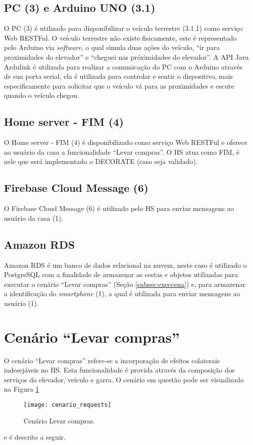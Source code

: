 \subsection{PC (3) e Arduino UNO (3.1)}
\label{subsec:pcarduino}
O PC (3) é utilizado para disponibilizar o veículo terrestre (3.1.1) como serviço Web RESTFul. O veículo terrestre não existe fisicamente, este é representado pelo Arduino via \textit{software}, o qual simula duas ações do veículo, ``ir para proximidades do elevador'' e ``cheguei nas próximidades do elevador''. A API Java Ardulink\footnotemark {} é utilizada para realizar a comunicação do PC com o Arduino através de sua porta serial, ela é utilizada para controlar e sentir o dispositivo, mais especificamente para solicitar que o veículo vá para as proximidades e escute quando o veículo chegou.

\subsection{Home server - FIM (4)}
\label{subsec:hsfim}
O Home server - FIM (4) é disponibilizado como serviço Web RESTFul e oferece ao usuário da casa a funcionalidade ``Levar compras''. O HS atua como FIM, é nele que será implementado o DECORATE (caso seja validado).

\subsection{Firebase Cloud Message (6)}
\label{subsec:fireb}
O Firebase Cloud Message\footnotemark {} (6) é utilizado pelo HS para enviar mensagens ao usuário da casa (1).

\subsection{Amazon RDS}
\label{subsec:rds}
Amazon RDS\footnotemark {} é um banco de dados relacional na nuvem, neste caso é utilizado o PostgreSQL\footnotemark {} com a finalidade de armazenar as cestas e objetos utilizadas para executar o cenário ``Levar compras'' (Seção \ref{subsec:execcena}) e, para armazenar a identificação do \textit{smartphone} (1), a qual é utilizada para enviar mensagens ao usuário (1).
 
\section{Cenário ``Levar compras''}
\label{sec:cenario}
O cenário ``Levar compras'' refere-se a incorporação de efeitos colaterais indesejáveis no HS. Esta funcionalidade é provida através da composição dos serviços do elevador, veículo e garra. O cenário em questão pode ser visualizado na Figura \ref{fig:cenario} 
\begin{figure}[!htb] \centering 
  \centering
  \texttt{[image: cenario\_requests]} 
  \caption{Cenário Levar compras.} 
  \label{fig:cenario}
\end{figure} e é descrito a seguir.

